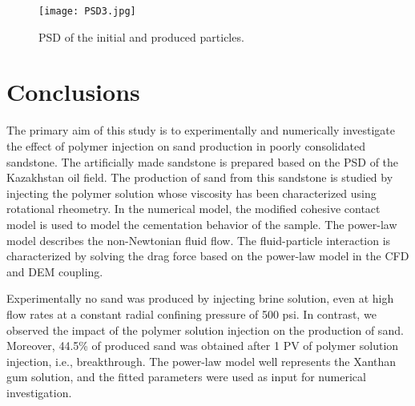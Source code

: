 \documentclass{article}
\begin{document}
\begin{figure}[H]
\begin{centering}
\texttt{[image: PSD3.jpg]}
\par\end{centering}
\caption{PSD of the initial and produced particles.\label{fig:PSD_produced}}
\end{figure}

\section{Conclusions}
\label{sec:conclusion}

The primary aim of this study is to experimentally and numerically investigate the effect of polymer injection on sand production in poorly consolidated sandstone. The artificially made sandstone is prepared based on the PSD of the Kazakhstan oil field. The production of sand from this sandstone is studied by injecting the polymer solution whose viscosity has been characterized using rotational rheometry. In the numerical model, the modified cohesive contact model is used to model the cementation behavior of the sample. The power-law model describes the non-Newtonian fluid flow. The fluid-particle interaction is characterized by solving the drag force based on the power-law model in the CFD and DEM coupling.  

Experimentally no sand was produced by injecting brine solution, even at high flow rates at a constant radial confining pressure of 500 psi. In contrast, we observed the impact of the polymer solution injection on the production of sand. Moreover, 44.5\% of produced sand was obtained after 1 PV of polymer solution injection, i.e., breakthrough. The power-law model well represents the Xanthan gum solution, and the fitted parameters were used as input for numerical investigation.
\end{document}
